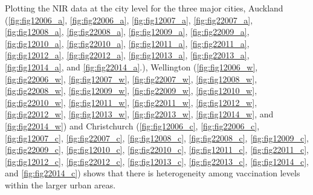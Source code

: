 \documentclass{article}
\begin{document}
Plotting the NIR data at the city level for the three major cities, Auckland (\autoref{fig:fig12006_a}, \autoref{fig:fig22006_a}, \autoref{fig:fig12007_a}, \autoref{fig:fig22007_a}, \autoref{fig:fig12008_a}, \autoref{fig:fig22008_a}, \autoref{fig:fig12009_a}, \autoref{fig:fig22009_a}, \autoref{fig:fig12010_a}, \autoref{fig:fig22010_a}, \autoref{fig:fig12011_a}, \autoref{fig:fig22011_a}, \autoref{fig:fig12012_a}, \autoref{fig:fig22012_a}, \autoref{fig:fig12013_a}, \autoref{fig:fig22013_a}, \autoref{fig:fig12014_a}, and \autoref{fig:fig22014_a}.), Wellington (\autoref{fig:fig12006_w}, \autoref{fig:fig22006_w}, \autoref{fig:fig12007_w}, \autoref{fig:fig22007_w}, \autoref{fig:fig12008_w}, \autoref{fig:fig22008_w}, \autoref{fig:fig12009_w}, \autoref{fig:fig22009_w}, \autoref{fig:fig12010_w}, \autoref{fig:fig22010_w}, \autoref{fig:fig12011_w}, \autoref{fig:fig22011_w}, \autoref{fig:fig12012_w}, \autoref{fig:fig22012_w}, \autoref{fig:fig12013_w}, \autoref{fig:fig22013_w}, \autoref{fig:fig12014_w}, and \autoref{fig:fig22014_w}) and Christchurch (\autoref{fig:fig12006_c}, \autoref{fig:fig22006_c}, \autoref{fig:fig12007_c}, \autoref{fig:fig22007_c}, \autoref{fig:fig12008_c}, \autoref{fig:fig22008_c}, \autoref{fig:fig12009_c}, \autoref{fig:fig22009_c}, \autoref{fig:fig12010_c}, \autoref{fig:fig22010_c}, \autoref{fig:fig12011_c}, \autoref{fig:fig22011_c}, \autoref{fig:fig12012_c}, \autoref{fig:fig22012_c}, \autoref{fig:fig12013_c}, \autoref{fig:fig22013_c}, \autoref{fig:fig12014_c}, and \autoref{fig:fig22014_c}) shows that there is heterogeneity among vaccination levels within the larger urban areas.
\end{document}
